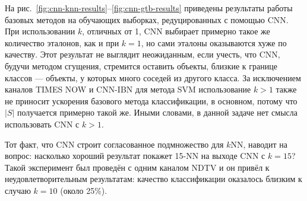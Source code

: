 На рис.~\ref{fig:cnn-knn-results}--\ref{fig:cnn-gtb-results} приведены результаты работы базовых методов на обучающих выборках, редуцированных с помощью CNN. При использовании \(k\), отличных от 1, CNN выбирает примерно такое же количество эталонов, как и при \(k=1\), но сами эталоны оказываются хуже по качеству. Этот результат не выглядит неожиданным, если учесть, что CNN, будучи методом сгущения, стремится оставить объекты, близкие к границе классов --- объекты, у которых много соседей из другого класса. За исключением каналов TIMES NOW и CNN-IBN для метода SVM использование \(k>1\) также не приносит ускорения базового метода классификации, в основном, потому что \(\left|S\right|\) получается примерно такой же. Иными словами, в данной задаче нет смысла использовать CNN с \(k>1\).

Тот факт, что CNN строит согласованное подмножество для \(k\)NN, наводит на вопрос: насколько хороший результат покажет 15-NN на выходе CNN с \(k=15\)? Такой эксперимент был проведён с одним каналом NDTV и он привёл к неудовлетворительным результатам: качество классификации оказалось близким к случаю \(k=10\) (около 25\%).

